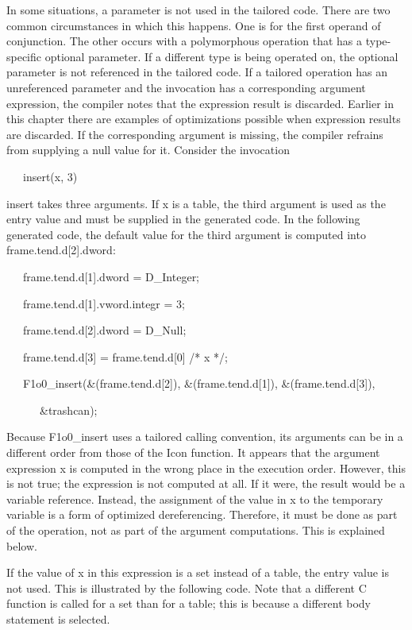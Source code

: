 In some situations, a parameter is not used in the tailored
code. There are two common circumstances in which this happens. One is
for the first operand of conjunction. The other occurs with a
polymorphous operation that has a type-specific optional parameter. If
a different type is being operated on, the optional parameter is not
referenced in the tailored code. If a tailored operation has an
unreferenced parameter and the invocation has a corresponding argument
expression, the compiler notes that the expression result is
discarded. Earlier in this chapter there are examples of optimizations
possible when expression results are discarded. If the corresponding
argument is missing, the compiler refrains from supplying a null value
for it. Consider the invocation

{\ttfamily\mdseries
\ \ \ insert(x, 3)}

\noindent insert takes three arguments. If x is a table, the third
argument is used as the entry value and must be supplied in the
generated code. In the following generated code, the default value for
the third argument is computed into frame.tend.d[2].dword:

{\ttfamily\mdseries
\ \ \ frame.tend.d[1].dword = D\_Integer;}

{\ttfamily\mdseries
\ \ \ frame.tend.d[1].vword.integr = 3;}

{\ttfamily\mdseries
\ \ \ frame.tend.d[2].dword = D\_Null;}

{\ttfamily\mdseries
\ \ \ frame.tend.d[3] = frame.tend.d[0] /* x */;}

{\ttfamily\mdseries
\ \ \ F1o0\_insert(\&(frame.tend.d[2]), \&(frame.tend.d[1]), \&(frame.tend.d[3]),}

{\ttfamily\mdseries
\ \ \ \ \ \ \&trashcan);}


Because F1o0\_insert uses a tailored calling convention, its arguments
can be in a different order from those of the Icon function. It
appears that the argument expression x is computed in the wrong place
in the execution order.  However, this is not true; the expression is
not computed at all. If it were, the result would be a variable
reference.  Instead, the assignment of the value in x to the temporary
variable is a form of optimized dereferencing. Therefore, it must be
done as part of the operation, not as part of the argument
computations. This is explained below.

If the value of x in this expression is a set instead of a table, the
entry value is not used. This is illustrated by the following
code. Note that a different C function is called for a set than for a
table; this is because a different body statement is selected.

